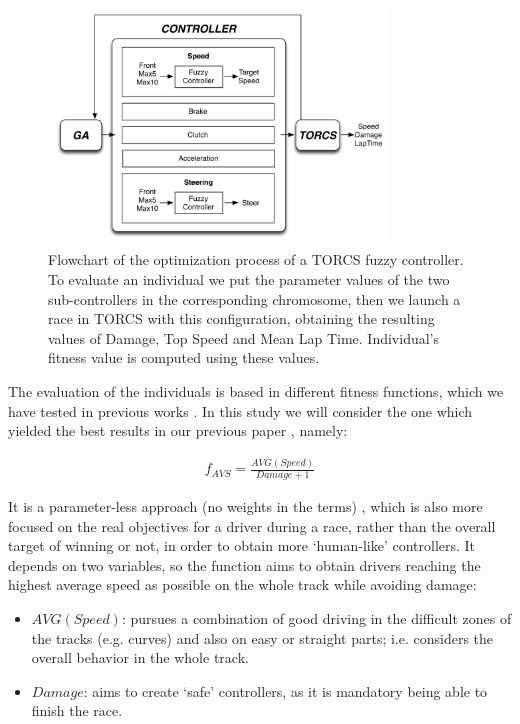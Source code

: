 \documentclass[conference]{IEEEtran}
\begin{document}
\begin{figure}[!ht]
  \label{fig:ga}
  \begin{center}
    \includegraphics[width=9cm]{fig/flowchart}
  \end{center}
  \caption{Flowchart of  the optimization process of a TORCS fuzzy controller. To evaluate an individual we put the parameter values of the two sub-controllers in the corresponding chromosome, then we launch a race in TORCS with this configuration, obtaining the resulting values of Damage, Top Speed and Mean Lap Time. Individual's fitness value is computed using these values.}
\end{figure}

The evaluation of the individuals is based in different fitness functions, which we have tested in previous works \cite{salem_evo18}. In this study we will consider the one which yielded the best results in our previous paper \cite{salem_cig2018}, namely:

\begin{equation} \label{fit2}
	\begin{array}{lll}
	f_{AVS}= \frac{AVG(Speed)}{Damage+1}
	\end{array}
\end{equation}	

It is a parameter-less approach (no weights in the terms) \cite{Harik-ParameterLess99}, which is also more focused on the real objectives for a driver during a race, rather than the overall target of winning or not,
in order to obtain more `human-like' controllers. It depends on two variables, so the function aims to obtain drivers reaching the highest average speed as possible on the whole track while avoiding damage:

\begin{itemize}
\item $AVG(Speed)$: pursues a combination of good driving in the difficult zones of the tracks (e.g. curves) and also on easy or straight parts; i.e. considers the overall behavior in the whole track.
\item $Damage$: aims to create `safe' controllers, as it is mandatory being able to finish the race.
\end{itemize} 
\end{document}
